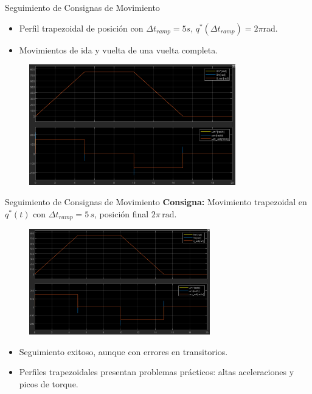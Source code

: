 \documentclass[12pt]{beamer}
\begin{document}
\begin{frame}{Seguimiento de Consignas de Movimiento}
    \begin{itemize}
        \item Perfil trapezoidal de posición con $\Delta t_{ramp} = 5s$, $q^*(\Delta t_{ramp}) = 2\pi$rad.
        \item Movimientos de ida y vuelta de una vuelta completa.
    \end{itemize}
    \begin{figure}[H]
        \centering
        \includegraphics[width=0.8\textwidth]{Imagenes/PosicionVelocidadSimulacionModeloCompleto.png}
    \end{figure}
\end{frame}

\begin{frame}{Seguimiento de Consignas de Movimiento}
\textbf{Consigna:}
  Movimiento trapezoidal en \(q^*(t)\) con \(\Delta t_{ramp} = 5\,s\), posición final \(2\pi \, \text{rad}\).


\begin{figure}[h]
    \centering
    \includegraphics[width=0.7\textwidth]{Imagenes/PosicionVelocidadSimulacionModeloCompleto.png}
\end{figure}
\begin{itemize}\small
    \item Seguimiento exitoso, aunque con errores en transitorios.
    \item Perfiles trapezoidales presentan problemas prácticos: altas aceleraciones y picos de torque.
\end{itemize}
\end{frame}
\end{document}
